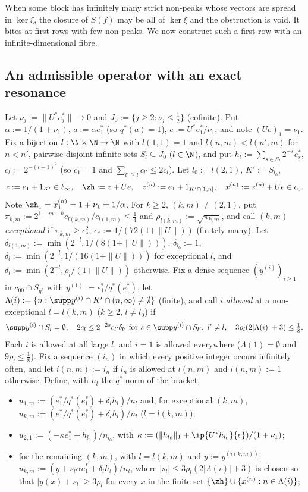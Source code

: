 When some block has infinitely many strict non-peaks whose vectors are
spread in $\ker\xi$, the closure of $S(f)$ may be all of $\ker\xi$ and the
obstruction is void.  It bites at first rows with few non-peaks.  We now
construct such a first row with an infinite-dimensional fibre.

\subsection{An admissible operator with an exact resonance}
Let $\nu_j:=\|U^*e_j^*\|\to0$ and $J_0:=\{j\ge2:\nu_j\le\frac12\}$
(cofinite).  Put $\alpha:=1/(1+\nu_1)$, $a:=\alpha e_1^*$ (so $q^*(a)=1$),
$e:=U^*e_1^*/\nu_1$, and note $(Ue)_1=\nu_1$.  Fix a bijection
$l:\N\times\N\to\N$ with $l(1,1)=1$ and $l(n,m)<l(n',m)$ for $n<n'$, pairwise
disjoint infinite sets $S_l\subseteq J_0$ ($l\in\N$), and put
$h_l:=\sum_{s\in S_l}2^{-s}e_s^*$, $c_l:=2^{-(l-1)^2}$ (so $c_1=1$ and
$\sum_{l'\ge l}c_{l'}\le2c_l$).  Let $l_0:=l(2,1)$, $K':=S_{l_0}$,
\[
 z:=e_1+1_{K'}\in\ell_\infty,\quad \zh:=z+Ue,\quad
 z^{(n)}:=e_1+1_{K'\cap[1,n]},\quad x^{(n)}:=z^{(n)}+Ue\in c_0 .
\]
Note $\zh_1=x^{(n)}_1=1+\nu_1=1/\alpha$.  For $k\ge2$, $(k,m)\ne(2,1)$, put
$\pi_{k,m}:=2^{1-m-k}c_{l(k,m)}/c_{l(1,m)}\le\frac14$ and
$\rho_{l(k,m)}:=\sqrt{\pi_{k,m}}$, and call $(k,m)$ \emph{exceptional} if
$\pi_{k,m}\ge\epsilon_*^2$, $\epsilon_*:=1/(72(1+\|U\|))$ (finitely many).
Let $\delta_{l(1,m)}:=\min(2^{-l},1/(8(1+\|U\|)))$, $\delta_{l_0}:=1$,
$\delta_l:=\min(2^{-l},1/(16(1+\|U\|)))$ for exceptional $l$, and
$\delta_l:=\min(2^{-l},\rho_l/(1+\|U\|))$ otherwise.  Fix a dense sequence
$(y^{(i)})_{i\ge1}$ in $c_{00}\cap S_{q^*}$ with $y^{(1)}:=e_1^*/q^*(e_1^*)$,
let $\Lambda(i):=\{n:\supp y^{(i)}\cap K'\cap(n,\infty)\ne\emptyset\}$
(finite), and call $i$ \emph{allowed} at a non-exceptional
$l=l(k,m)$ ($k\ge2$, $l\ne l_0$) if
\[
 \supp y^{(i)}\cap S_l=\emptyset,\quad 2c_l\le2^{-2s}c_{l'}\delta_{l'}
 \text{ for } s\in\supp y^{(i)}\cap S_{l'},\ l'\ne l,\quad
 3\rho_l(2|\Lambda(i)|+3)\le\tfrac18 .
\]
Each $i$ is allowed at all large $l$, and $i=1$ is allowed everywhere
($\Lambda(1)=\emptyset$ and $9\rho_l\le\frac18$).  Fix a sequence $(i_n)$ in
which every positive integer occurs infinitely often, and let
$i(n,m):=i_n$ if $i_n$ is allowed at $l(n,m)$ and $i(n,m):=1$ otherwise.
Define, with $n_l$ the $q^*$-norm of the bracket,
\begin{itemize}
\item $u_{1,m}:=(e_1^*/q^*(e_1^*)+\delta_lh_l)/n_l$ and, for exceptional
$(k,m)$, $u_{k,m}:=(e_1^*/q^*(e_1^*)+\delta_lh_l)/n_l$ ($l=l(k,m)$);
\item $u_{2,1}:=(-\kappa e_1^*+h_{l_0})/n_{l_0}$, with
$\kappa:=(\|h_{l_0}\|_1+\ip{U^*h_{l_0}}{e})/(1+\nu_1)$;
\item for the remaining $(k,m)$, with $l=l(k,m)$ and $y:=y^{(i(k,m))}$:
$u_{k,m}:=(y+s_l\alpha e_1^*+\delta_lh_l)/n_l$, where
$|s_l|\le3\rho_l(2|\Lambda(i)|+3)$ is chosen so that $|y(x)+s_l|\ge3\rho_l$
for every $x$ in the finite set $\{\zh\}\cup\{x^{(n)}:n\in\Lambda(i)\}$;
\end{itemize}
